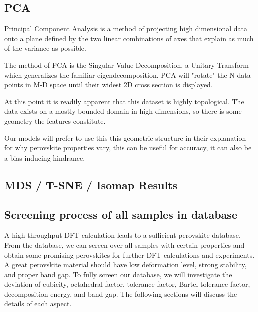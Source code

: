\documentclass[twoside,twocolumn,9pt]{article}
\begin{document}
    \subsection*{PCA}
    Principal Component Analysis is a method of projecting high
    dimensional data onto a plane defined by the two linear
    combinations of axes that explain as much of the variance as
    possible.

    The method of PCA is the Singular Value Decomposition, a Unitary
    Transform which generalizes the familiar eigendecomposition. PCA
    will "rotate" the N data points in M-D space until their widest 2D
    cross section is displayed.
    
    At this point it is readily apparent that this dataset is highly
    topological. The data exists on a mostly bounded domain in high
    dimensions, so there is some geometry the features constitute.

    Our models will prefer to use this this geometric structure in their
    explanation for why perovskite properties vary, this can be useful
    for accuracy, it can also be a bias-inducing hindrance.

    \subsection*{MDS / T-SNE / Isomap Results}

    \subsection*{Screening process of all samples in database}
    A high-throughput DFT calculation leads to a sufficient perovskite
    database. From the database, we can screen over all samples with
    certain properties and obtain some promising perovskites for further
    DFT calculations and experiments. A great perovskite material should
    have low deformation level, strong stability, and proper band gap. To
    fully screen our database, we will investigate the deviation of
    cubicity, octahedral factor, tolerance factor, Bartel tolerance
    factor, decomposition energy, and band gap. The following sections
    will discuss the details of each aspect.
\end{document}
